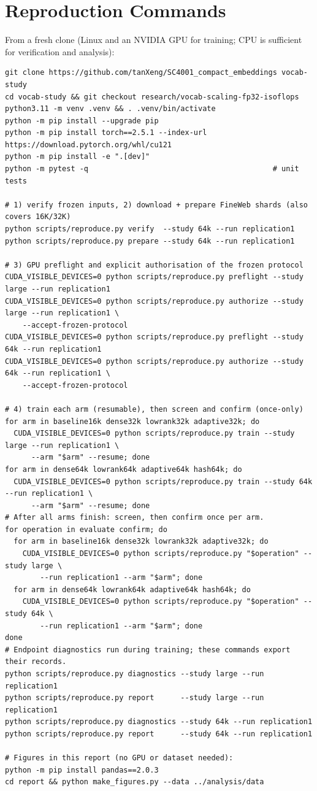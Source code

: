 \documentclass[10pt,a4paper]{article}
\begin{document}
\section{Reproduction Commands}
\label{app:repro}
From a fresh clone (Linux and an NVIDIA GPU for training; CPU is sufficient for verification and analysis):
{\footnotesize
\begin{verbatim}
git clone https://github.com/tanXeng/SC4001_compact_embeddings vocab-study
cd vocab-study && git checkout research/vocab-scaling-fp32-isoflops
python3.11 -m venv .venv && . .venv/bin/activate
python -m pip install --upgrade pip
python -m pip install torch==2.5.1 --index-url https://download.pytorch.org/whl/cu121
python -m pip install -e ".[dev]"
python -m pytest -q                                          # unit tests

# 1) verify frozen inputs, 2) download + prepare FineWeb shards (also covers 16K/32K)
python scripts/reproduce.py verify  --study 64k --run replication1
python scripts/reproduce.py prepare --study 64k --run replication1

# 3) GPU preflight and explicit authorisation of the frozen protocol
CUDA_VISIBLE_DEVICES=0 python scripts/reproduce.py preflight --study large --run replication1
CUDA_VISIBLE_DEVICES=0 python scripts/reproduce.py authorize --study large --run replication1 \
    --accept-frozen-protocol
CUDA_VISIBLE_DEVICES=0 python scripts/reproduce.py preflight --study 64k --run replication1
CUDA_VISIBLE_DEVICES=0 python scripts/reproduce.py authorize --study 64k --run replication1 \
    --accept-frozen-protocol

# 4) train each arm (resumable), then screen and confirm (once-only)
for arm in baseline16k dense32k lowrank32k adaptive32k; do
  CUDA_VISIBLE_DEVICES=0 python scripts/reproduce.py train --study large --run replication1 \
      --arm "$arm" --resume; done
for arm in dense64k lowrank64k adaptive64k hash64k; do
  CUDA_VISIBLE_DEVICES=0 python scripts/reproduce.py train --study 64k --run replication1 \
      --arm "$arm" --resume; done
# After all arms finish: screen, then confirm once per arm.
for operation in evaluate confirm; do
  for arm in baseline16k dense32k lowrank32k adaptive32k; do
    CUDA_VISIBLE_DEVICES=0 python scripts/reproduce.py "$operation" --study large \
        --run replication1 --arm "$arm"; done
  for arm in dense64k lowrank64k adaptive64k hash64k; do
    CUDA_VISIBLE_DEVICES=0 python scripts/reproduce.py "$operation" --study 64k \
        --run replication1 --arm "$arm"; done
done
# Endpoint diagnostics run during training; these commands export their records.
python scripts/reproduce.py diagnostics --study large --run replication1
python scripts/reproduce.py report      --study large --run replication1
python scripts/reproduce.py diagnostics --study 64k --run replication1
python scripts/reproduce.py report      --study 64k --run replication1

# Figures in this report (no GPU or dataset needed):
python -m pip install pandas==2.0.3
cd report && python make_figures.py --data ../analysis/data
\end{verbatim}
}
\end{document}
